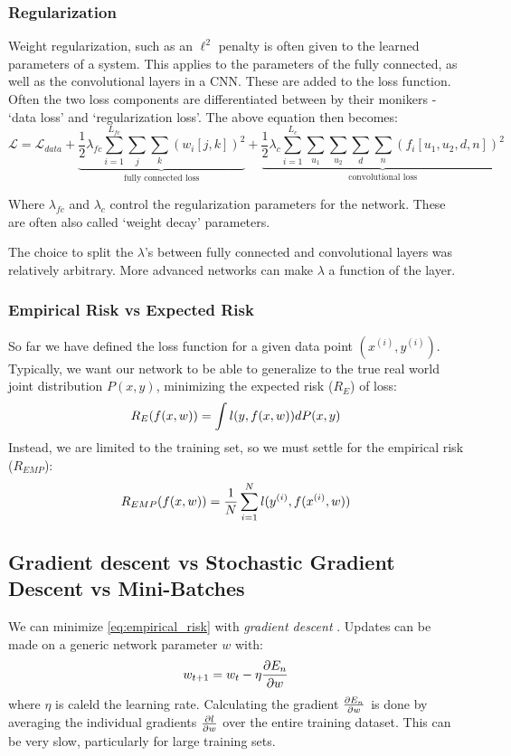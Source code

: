\subsubsection{Regularization}
  Weight regularization, such as an $\ell^2$ penalty is often given to the
  learned parameters of a system. This applies to the parameters of the fully
  connected, as well as the convolutional layers in a CNN\@. These are added to
  the loss function. Often the two loss components are differentiated between by
  their monikers - `data loss' and `regularization loss'. The above 
  equation then becomes:
  \begin{equation}
    \mathcal{L} = \mathcal{L}_{data} + \underbrace{\frac{1}{2}\lambda_{fc}
    \sum_{i=1}^{L_{fc}} \sum_{j} \sum_{k} {(w_{i}[j,k])}^2}_{\text{fully connected
    loss}} +
    \underbrace{\frac{1}{2}\lambda_{c} \sum_{i=1}^{L_c} \sum_{u_1} \sum_{u_2} \sum_{d}
    \sum_{n} \left(f_i[u_1,u_2,d,n]\right)^2}_{\text{convolutional loss}}
  \end{equation}

  Where $\lambda_{fc}$ and $\lambda_{c}$ control the regularization parameters
  for the network. These are often also called `weight decay' parameters.

  The choice to split the $\lambda$'s between fully connected and convolutional
  layers was relatively arbitrary. More advanced networks can make $\lambda$
  a function of the layer. 

\subsubsection{Empirical Risk vs Expected Risk}
  So far we have defined the loss function for a given data point $(x^{(i)},
  y^{(i)})$. Typically, we want our network to be able to generalize to the
  true real world joint distribution $P(x,y)$, minimizing the expected risk ($R_E$) of
  loss:
  \begin{equation}
    R_E(f(x,w)) = \int l(y,f(x,w)) dP(x,y)
  \end{equation}
  Instead, we are limited to the training set, so we must settle for the
  empirical risk ($R_{EMP}$):
  \begin{equation}
    R_{EMP}(f(x,w)) = \frac{1}{N} \sum_{i=1}^{N} l( y^{(i)},f(x^{(i)}, w))
    \label{eq:empirical_risk}
  \end{equation}

\subsection{Gradient descent vs Stochastic Gradient Descent vs Mini-Batches}
  We can minimize \autoref{eq:empirical_risk} with \emph{gradient descent}
  \citep{rumelhart_parallel_1986}. Updates can be made on a generic network
  parameter $w$ with:
  \begin{equation}
    w_{t+1} = w_{t} - \eta \frac{\partial E_n}{\partial w}
  \end{equation}
  where $\eta$ is caleld the learning rate. Calculating the gradient
  $\frac{\partial E_n}{\partial w}$ is done by averaging the individual gradients
  $\frac{\partial l}{\partial w}$ over the entire training dataset. This can be very slow,
  particularly for large training sets.
  
